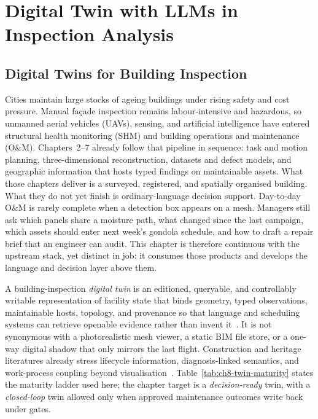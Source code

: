\chapter{Digital Twin with LLMs in Inspection Analysis}
\label{ch:llm-dt}


\section{Digital Twins for Building Inspection}
\label{sec:ch8-dt}

Cities maintain large stocks of ageing buildings under rising safety and cost pressure. Manual fa\c{c}ade inspection remains labour-intensive and hazardous, so unmanned aerial vehicles (UAVs), sensing, and artificial intelligence have entered structural health monitoring (SHM) and building operations and maintenance (O\&M). Chapters~2--7 already follow that pipeline in sequence: task and motion planning, three-dimensional reconstruction, datasets and defect models, and geographic information that hosts typed findings on maintainable assets. What those chapters deliver is a surveyed, registered, and spatially organised building. What they do not yet finish is ordinary-language decision support. Day-to-day O\&M is rarely complete when a detection box appears on a mesh. Managers still ask which panels share a moisture path, what changed since the last campaign, which assets should enter next week's gondola schedule, and how to draft a repair brief that an engineer can audit. This chapter is therefore continuous with the upstream stack, yet distinct in job: it consumes those products and develops the language and decision layer above them.

A building-inspection \emph{digital twin} is an editioned, queryable, and controllably writable representation of facility state that binds geometry, typed observations, maintainable hosts, topology, and provenance so that language and scheduling systems can retrieve openable evidence rather than invent it~\cite{boje2020,opoku2021,lu2020,chen2023facility}. It is not synonymous with a photorealistic mesh viewer, a static BIM file store, or a one-way digital shadow that only mirrors the last flight. Construction and heritage literatures already stress lifecycle information, diagnosis-linked semantics, and work-process coupling beyond visualisation~\cite{bruno2018,tsilimantou2020,lu2020}. Table~\ref{tab:ch8-twin-maturity} states the maturity ladder used here; the chapter target is a \emph{decision-ready} twin, with a \emph{closed-loop} twin allowed only when approved maintenance outcomes write back under gates.

